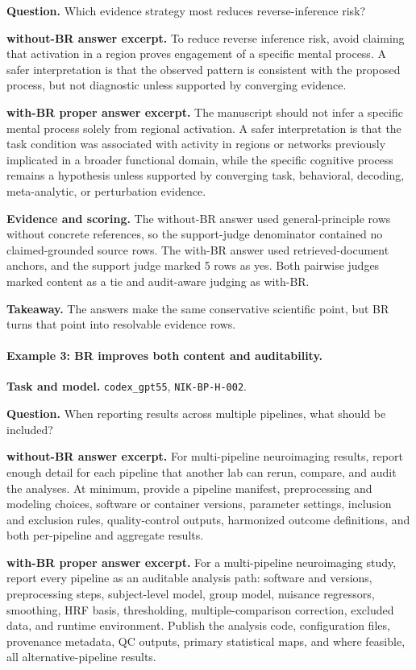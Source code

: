 {\textbf{Question.} Which evidence strategy most reduces reverse-inference risk?

\textbf{without-BR answer excerpt.} To reduce reverse inference risk, avoid claiming that activation in a region proves engagement of a specific mental process. A safer interpretation is that the observed pattern is consistent with the proposed process, but not diagnostic unless supported by converging evidence.

\textbf{with-BR proper answer excerpt.} The manuscript should not infer a specific mental process solely from regional activation. A safer interpretation is that the task condition was associated with activity in regions or networks previously implicated in a broader functional domain, while the specific cognitive process remains a hypothesis unless supported by converging task, behavioral, decoding, meta-analytic, or perturbation evidence.

\textbf{Evidence and scoring.} The without-BR answer used general-principle rows without concrete references, so the support-judge denominator contained no claimed-grounded source rows. The with-BR answer used retrieved-document anchors, and the support judge marked 5 rows as yes. Both pairwise judges marked content as a tie and audit-aware judging as with-BR.

\textbf{Takeaway.} The answers make the same conservative scientific point, but BR turns that point into resolvable evidence rows.

\medskip

\paragraph{Example 3: BR improves both content and auditability.}
\textbf{Task and model.} \texttt{codex\_gpt55}, \texttt{NIK-BP-H-002}.

\textbf{Question.} When reporting results across multiple pipelines, what should be included?

\textbf{without-BR answer excerpt.} For multi-pipeline neuroimaging results, report enough detail for each pipeline that another lab can rerun, compare, and audit the analyses. At minimum, provide a pipeline manifest, preprocessing and modeling choices, software or container versions, parameter settings, inclusion and exclusion rules, quality-control outputs, harmonized outcome definitions, and both per-pipeline and aggregate results.

\textbf{with-BR proper answer excerpt.} For a multi-pipeline neuroimaging study, report every pipeline as an auditable analysis path: software and versions, preprocessing steps, subject-level model, group model, nuisance regressors, smoothing, HRF basis, thresholding, multiple-comparison correction, excluded data, and runtime environment. Publish the analysis code, configuration files, provenance metadata, QC outputs, primary statistical maps, and where feasible, all alternative-pipeline results.

}
